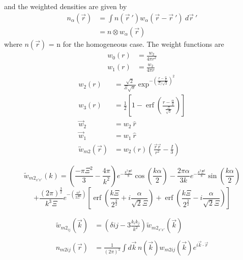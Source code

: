 \documentclass[double,12pt]{revtex4-2}
\begin{document}
and the weighted densities are given by 
\begin{align}
    n_\alpha(\vec r) &= \int n(\vec {r}~')w_\alpha(\vec r-\vec {r}~')
                    ~d\vec {r}~'  \label{weighted_densities}  \\
                     &= n\otimes w_\alpha(\vec r)
\end{align}  
where $n(\vec r)$ = n for the homogeneous case.
The weight functions are
\begin{align}\label{eq:weights}
  w_{0}(r) &=\frac{w_{2}}{4\pi{r}^2} \\
  w_{1}(r) &=\frac{w_{2}}{4\pi{r}} 
\end{align}
\begin{align}
  w_2(r) &=\frac{\sqrt{2}}{\Xi\sqrt\pi}\exp^{-\left(\frac{r-\frac{\alpha}
           {2}}{\Xi/\sqrt{2}}\right)^2}  \\
  w_3(r) &=\frac{1}{2}\left[1-\operatorname{erf}\left(\frac{r
          -\frac{\alpha}{2}}{\frac{\Xi}{\sqrt{2}}}\right)\right]  \\
%    
      \vec {w}_2 &= w_2~\hat r \\
      \vec {w}_1 &= w_1~\hat r \\
      \overleftrightarrow{w}_{m2}(\vec{r}) &= w_2(r)\left(\frac{\vec{r}
                                        \vec{r}}{r^2}-\frac{I}{3}\right) 
\end{align}

\begin{equation}
    {\widetilde{w}_{{m2}_{x'x'}}(k)=\left(\frac{-\pi{\Xi}^2}{3}
   -\frac{4\pi}{k^2}\right)e^{-\frac{k^2\Xi^2}{8}}\cos(\frac{k\alpha}{2})
   -\frac{2\pi\alpha}{3k}e^{-\frac{k^2\Xi^2}{8}}\sin(\frac{k\alpha}{2})}
   \nonumber
\end{equation} 
\begin{equation} %
   {+\frac{{(2\pi)}^{\frac{3}{2}}}{k^3\Xi}e^{-\left(\frac{\alpha^2}
   {2\Xi^2}\right)}\left[\operatorname{erf}\left(\frac{k\Xi}{2^\frac{3}{2}}
   +i\frac{\alpha}{\sqrt{2}\Xi}\right)+\operatorname{erf}\left(\frac{k\Xi}
   {2^\frac{3}{2}}-i\frac{\alpha}{\sqrt{2}\Xi}\right)\right]}
\end{equation} 

\begin{align}
    \widetilde{w}_{m2_{ij}}(\vec{k}) &= (\delta{ij}-3\frac{k_ik_j}{k^2})
                                    \widetilde{w}_{{m2}_{x'x'}}(\vec{k}) \\ \nonumber \\
    n_{m2ij}(\vec r) &=  \frac{1}{\left(2\pi\right)^3}\int d\vec k\, 
                       n(\vec k) w_{m2ij}(\vec k)e^{i\vec k\cdot \vec r}
\end{align} 
\end{document}
